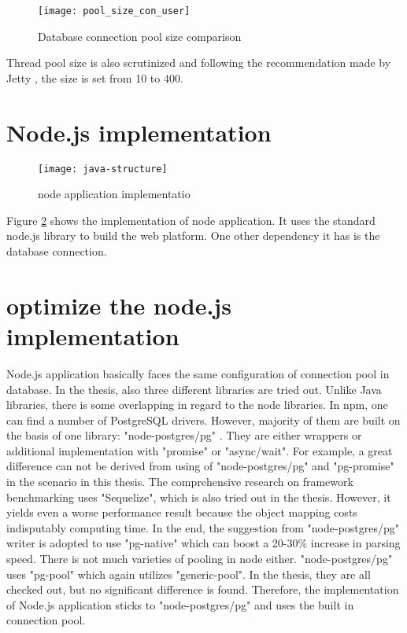 \begin{figure}[h]
	\centering
	\texttt{[image: pool\_size\_con\_user]}
	\caption{Database connection pool size comparison}
	\label{pool-comparison}
\end{figure}

Thread pool size is also scrutinized and following the recommendation made by Jetty \citep{threadpool}, the size is set from 10 to 400. \\

 \section{Node.js implementation}
 
 \begin{figure}[h]
 	\centering
 	\texttt{[image: java-structure]}
 	\caption{node application implementatio}
 	\label{node-implementation}
 \end{figure}
 
Figure \ref{node-implementation} shows the implementation of node application. It uses the standard node.js library to build the web platform. One other dependency it has is the database connection. 

\section{optimize the node.js implementation}
Node.js application basically faces the same configuration of connection pool in database. In the thesis, also three different libraries are tried out. Unlike Java libraries, there is some overlapping in regard to the node libraries. In npm, one can find a number of PostgreSQL drivers. However, majority of them are built on the basis of one library: "node-postgres/pg" \citep{node-pg}. They are either wrappers or additional implementation with "promise" or "async/wait". For example, a great difference can not be derived from using of "node-postgres/pg" and "pg-promise" in the scenario in this thesis. The comprehensive research on framework benchmarking \citep{benchmark} uses "Sequelize", which is also tried out in the thesis. However, it yields even a worse performance result because the object mapping costs indisputably computing time. In the end, the suggestion from "node-postgres/pg" writer is adopted to use "pg-native" which can boost a 20-30\% increase in parsing speed. There is not much varieties of pooling in node either. "node-postgres/pg" uses "pg-pool" which again utilizes "generic-pool". In the thesis, they are all checked out, but no significant difference is found. Therefore, the implementation of Node.js application sticks to "node-postgres/pg" and uses the built in connection pool.\\




